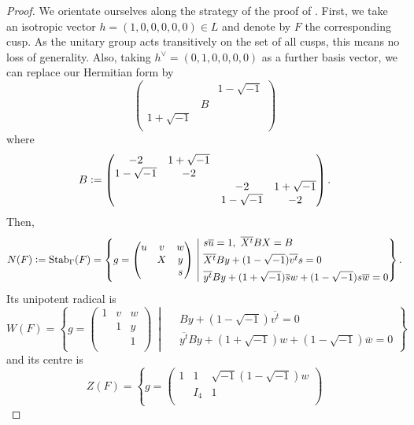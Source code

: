 \documentclass[12pt, pdftex]{amsart}
\theoremstyle{plain}
\theoremstyle{definition}
\numberwithin{equation}{section}
\def\Stab{\mathop{\mathrm{Stab}}\nolimits}
\newcommand{\defeq}{\vcentcolon=}
\begin{document}
\begin{proof}
    We orientate ourselves along the strategy of the proof of \cite[Proposition 7.8]{CMGHL19}.
    First, we take an isotropic vector $h=(1,0,0,0,0,0)\in L$ and denote by $F$ the corresponding cusp.
    As the unitary group acts transitively on the set of all cusps, this means no loss of generality.
    Also, taking $h^{\vee}=(0,1,0,0,0,0)$ as a further basis vector, we can replace our  Hermitian form by 
\[\begin{pmatrix}
 &  & 1-\sqrt{-1} \\
  & B & \\
1+\sqrt{-1}  &  &  \\
\end{pmatrix}\]
where
\[B\defeq\begin{pmatrix}
-2 & 1+\sqrt{-1} &  & \\
1-\sqrt{-1}  & -2 & & \\
  &  & -2 & 1+\sqrt{-1} \\
  &  & 1-\sqrt{-1} & -2  \\
\end{pmatrix}.\]
Then, 
\[N(F)\defeq\Stab_{\Gamma}(F)=\left\{g=\begin{pmatrix}
u & v & w  \\
  & X & y \\
  &  & s \\
\end{pmatrix}\ \middle|\ \begin{aligned}
&s\overline{u}=1,\ \overline{X^t}BX=B \\ &\overline{X^t}By+(1-\sqrt{-1})\overline{v^t}s=0\\ 
&\overline{y^t}By+(1+\sqrt{-1})\overline{s}w+(1-\sqrt{-1})s\overline{w}=0
\end{aligned}\right\}.\]
Its unipotent radical is
\[W(F)=\left\{g=\begin{pmatrix}
1 & v & w  \\
  & 1 & y \\
  &  & 1 \\
\end{pmatrix}\ \middle|\ \begin{aligned}
&By+(1-\sqrt{-1})\overline{v^t}=0\\ 
&\overline{y^t}By+(1+\sqrt{-1})w+(1-\sqrt{-1})\overline{w}=0
\end{aligned}\right\}\]
    and its centre is 
    \[Z(F)=\left\{g=\begin{pmatrix}
1 & 1 & \sqrt{-1}(1-\sqrt{-1})w  \\
  & I_{4} & 1 \\

\end{pmatrix}\]
\end{proof}
\end{document}
